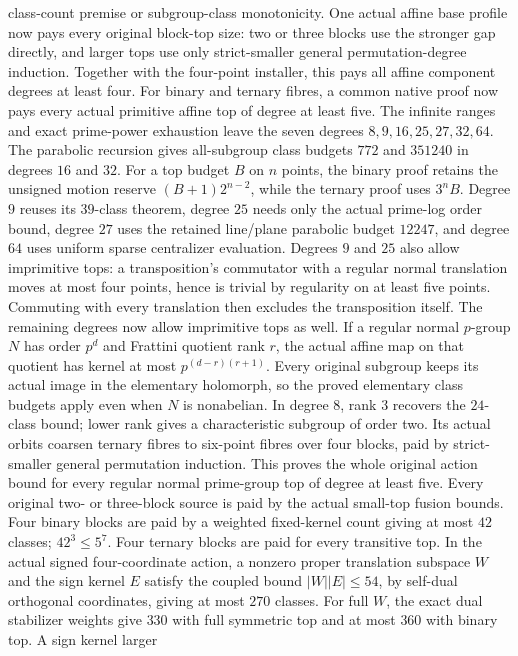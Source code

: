 class-count premise or subgroup-class monotonicity. One actual affine
base profile now pays every original block-top size: two or three
blocks use the stronger gap directly, and larger tops use only
strict-smaller general permutation-degree induction. Together with
the four-point installer, this pays all affine component degrees at
least four.
For binary and ternary fibres, a common native proof now pays every
actual primitive affine top of degree at least five. The infinite
ranges and exact prime-power exhaustion leave the seven degrees
$8,9,16,25,27,32,64$.
The parabolic recursion gives all-subgroup class budgets $772$ and
$351240$ in degrees $16$ and $32$. For a top budget $B$ on $n$ points,
the binary proof retains the unsigned motion reserve
$(B+1)2^{n-2}$, while the ternary proof uses $3^nB$.
Degree $9$ reuses its $39$-class theorem, degree $25$ needs only the
actual prime-log order bound, degree $27$ uses the retained line/plane
parabolic budget $12247$, and degree $64$ uses uniform sparse
centralizer evaluation. Degrees $9$ and $25$ also allow imprimitive
tops: a transposition's commutator with a regular normal translation
moves at most four points, hence is trivial by regularity on at least
five points. Commuting with every translation then excludes the
transposition itself. The remaining degrees now allow imprimitive tops
as well. If a regular normal $p$-group $N$ has order $p^d$ and Frattini
quotient rank $r$, the actual affine map on that quotient has kernel
at most $p^{(d-r)(r+1)}$. Every original subgroup keeps its actual
image in the elementary holomorph, so the proved elementary class
budgets apply even when $N$ is nonabelian. In degree $8$, rank $3$
recovers the $24$-class bound; lower rank gives a characteristic
subgroup of order two. Its actual orbits coarsen ternary fibres to
six-point fibres over four blocks, paid by strict-smaller general
permutation induction. This proves the whole original action bound
for every regular normal prime-group top of degree at least five.
Every original two- or three-block source is paid by the actual
small-top fusion bounds. Four binary blocks are paid by a weighted
fixed-kernel count giving at most $42$ classes; $42^3\leq5^7$.
Four ternary blocks are paid for every transitive top. In the actual
signed four-coordinate action, a nonzero proper translation subspace
$W$ and the sign kernel $E$ satisfy the coupled bound $|W||E|\leq54$,
by self-dual orthogonal coordinates, giving at most $270$ classes.
For full $W$, the exact dual stabilizer weights give $330$ with full
symmetric top and at most $360$ with binary top. A sign kernel larger
